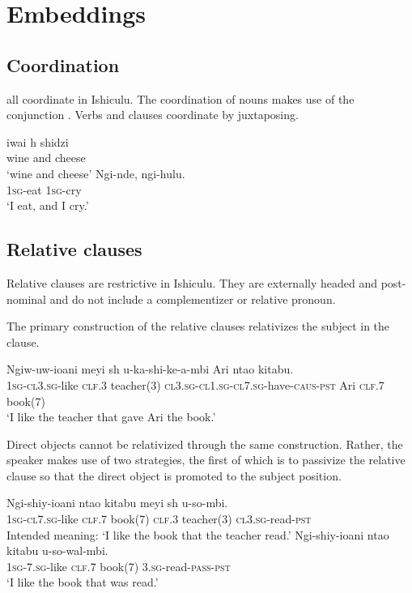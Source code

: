 \chapter{Embeddings}

\section{Coordination}

 all coordinate in Ishiculu. The coordination of nouns makes use of the conjunction \textit{}. Verbs and clauses coordinate by juxtaposing.

\begin{exe}
\ex
\gll iwai {h\textramshorns} shidzi \\
wine and cheese \\
\trans `wine and cheese'
\ex
\gll Ngi-nde, ngi-hulu. \\
\textsc{1sg}-eat \textsc{1sg}-cry \\
\trans `I eat, and I cry.'
\end{exe}

\section{Relative clauses}

Relative clauses are restrictive in Ishiculu. They are externally headed and post-nominal and do not include a complementizer or relative pronoun.

The primary construction of the relative clauses relativizes the subject in the clause.

\begin{exe}
\ex
\gll Ngiw-uw-ioani meyi {sh\textramshorns} u-ka-shi-ke-\textbeltl a-mbi Ari nta\textbeltl o kitabu. \\
\textsc{1sg}-\textsc{cl3.sg}-like \textsc{clf.3} teacher(3) \textsc{cl3.sg}-\textsc{cl1.sg}-\textsc{cl7.sg}-have-\textsc{caus}-\textsc{pst} Ari \textsc{clf.7} book(7) \\
\trans `I like the teacher that gave Ari the book.'
\end{exe}

Direct objects cannot be relativized through the same construction. Rather, the speaker makes use of two strategies, the first of which is to passivize the relative clause so that the direct object is promoted to the subject position.

\begin{exe}
\ex
\gll * Ngi-shiy-ioani nta\textbeltl o kitabu meyi {sh\textramshorns} u-so-mbi. \\
{} \textsc{1sg}-\textsc{cl7.sg}-like \textsc{clf.7} book(7) \textsc{clf.3} teacher(3) \textsc{cl3.sg}-read-\textsc{pst} \\
\trans Intended meaning: `I like the book that the teacher read.'
\ex
\gll Ngi-shiy-ioani nta\textbeltl o kitabu u-so-wal\textramshorns-mbi. \\
\textsc{1sg}-\textsc{7.sg}-like \textsc{clf.7} book(7)  \textsc{3.sg}-read-\textsc{pass}-\textsc{pst} \\
\trans `I like the book that was read.'
\end{exe}

